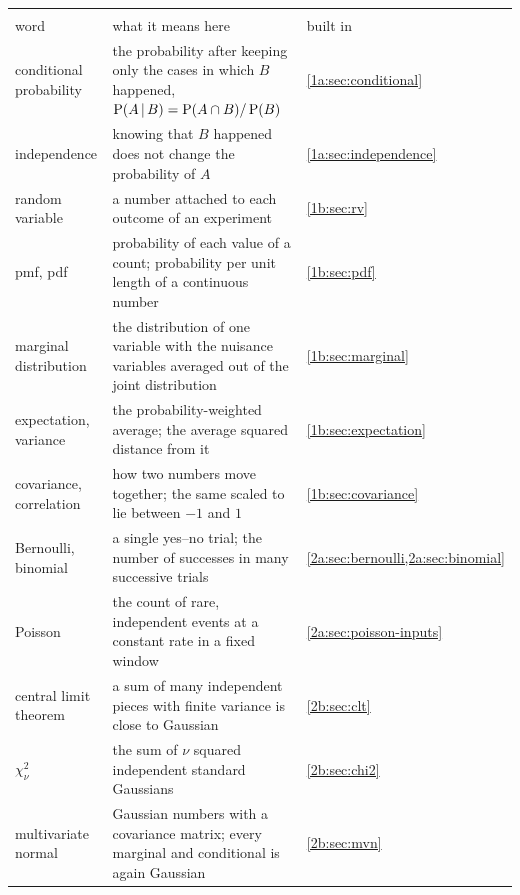 \begin{center}
\small
\renewcommand{\arraystretch}{1.18}
\begin{tabularx}{\linewidth}{@{}>{\raggedright\arraybackslash}p{3.0cm}
                               >{\raggedright\arraybackslash}X
                               >{\raggedright\arraybackslash}p{2.0cm}@{}}
\toprule
\multicolumn{3}{@{}l}{\textbf{The language of probability}}\\
word & what it means here & built in\\\midrule
conditional probability & the probability after keeping only the cases in which $B$ happened, $\operatorname{P}(A\,\vert\, B)=\operatorname{P}(A\cap B)/\operatorname{P}(B)$ & \cref{1a:sec:conditional}\\
independence & knowing that $B$ happened does not change the probability of $A$ & \cref{1a:sec:independence}\\
random variable & a number attached to each outcome of an experiment & \cref{1b:sec:rv}\\
pmf, pdf & probability of each value of a count; probability per unit length of a continuous number & \cref{1b:sec:pdf}\\
marginal distribution & the distribution of one variable with the nuisance variables averaged out of the joint distribution & \cref{1b:sec:marginal}\\
expectation, variance & the probability-weighted average; the average squared distance from it & \cref{1b:sec:expectation}\\
covariance, correlation & how two numbers move together; the same scaled to lie between $-1$ and $1$ & \cref{1b:sec:covariance}\\
Bernoulli, binomial & a single yes--no trial; the number of successes in many successive trials & \cref{2a:sec:bernoulli,2a:sec:binomial}\\
Poisson & the count of rare, independent events at a constant rate in a fixed window & \cref{2a:sec:poisson-inputs}\\
central limit theorem & a sum of many independent pieces with finite variance is close to Gaussian & \cref{2b:sec:clt}\\
$\chi^2_\nu$ & the sum of $\nu$ squared independent standard Gaussians & \cref{2b:sec:chi2}\\
multivariate normal & Gaussian numbers with a covariance matrix; every marginal and conditional is again Gaussian & \cref{2b:sec:mvn}\\
\bottomrule
\end{tabularx}
\end{center}

